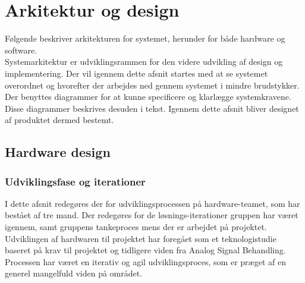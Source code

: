 \chapter{Arkitektur og design}
Følgende beskriver arkitekturen for systemet, herunder for både hardware og software. \\
Systemarkitektur er udviklingsrammen for den videre udvikling af design og implementering. Der vil igennem dette afsnit startes med at se systemet overordnet og hvorefter der arbejdes ned gennem systemet i mindre brudstykker. Der benyttes diagrammer for at kunne specificere og klarlægge systemkravene. Disse diagrammer beskrives desuden i tekst. Igennem dette afsnit bliver designet af produktet dermed bestemt.
\section{Hardware design}
\subsection{Udviklingsfase og iterationer}
I dette afsnit redegøres der for udviklingsprocessen på hardware-teamet, som har bestået af tre mand. Der redegøres for de løsnings-iterationer gruppen har været igennem, samt gruppens tankeproces mens der er arbejdet på projektet. Udviklingen af hardwaren til projektet har foregået som et teknologistudie baseret på krav til projektet og tidligere viden fra Analog Signal Behandling. Processen har været en iterativ og agil udviklingsproces, som er præget af en generel mangelfuld viden på området.
